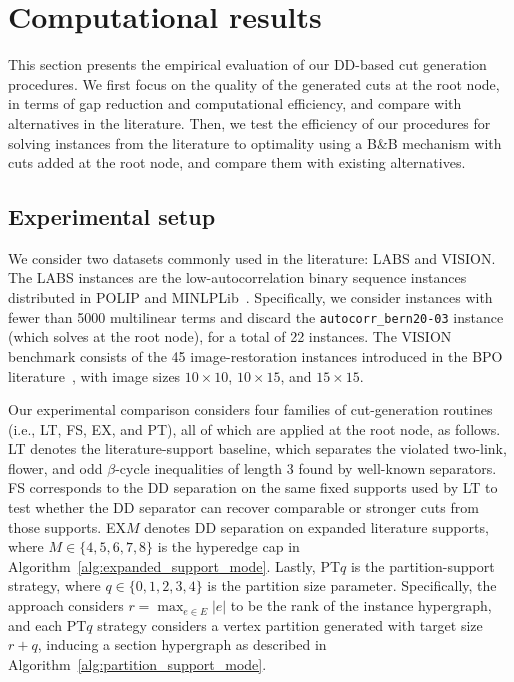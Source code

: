 \section{Computational results}
\label{sec:experimental_design}


This section presents the empirical evaluation of our DD-based cut generation procedures. We first focus on the quality of the generated cuts at the root node, in terms of gap reduction and computational efficiency, and compare with alternatives in the literature. Then, we test the efficiency of our procedures for solving instances from the literature to optimality using a B\&B mechanism with cuts added at the root node, and compare them with existing alternatives. %

 
\subsection{Experimental setup}


We consider two datasets commonly used in the literature: LABS and VISION.  The LABS instances are the low-autocorrelation binary sequence instances distributed in POLIP and MINLPLib~\cite{polip,minlplib,delPiaWalter2024simple}. Specifically, we consider instances with fewer than 5000 multilinear terms and discard the \texttt{autocorr\_bern20-03} instance (which solves at the root node), for a total of 22 instances. The VISION benchmark consists of the 45 image-restoration instances introduced in the BPO literature~\cite{delPiaKhajaviradSahinidis2020impact}, with image sizes $10\times 10$, $10\times 15$, and $15\times 15$.

Our experimental comparison considers four families of cut-generation routines (i.e., LT, FS, EX, and PT), all of which are applied at the root node, as follows. LT denotes the literature-support baseline, which separates the violated two-link, flower, and odd $\beta$-cycle inequalities of length 3 found by well-known separators. FS  corresponds to the DD separation on the same fixed supports used by LT to test whether the DD separator can recover comparable or stronger cuts from those supports. EX$M$ denotes DD separation on expanded literature supports, where $M\in \{4,5,6,7,8\}$ is the hyperedge cap in Algorithm~\ref{alg:expanded_support_mode}. Lastly, PT$q$ is the partition-support strategy, where $q\in \{0,1,2,3,4\}$ is the partition size parameter. Specifically, the approach considers $r=\max_{e\in E}|e|$ to be the rank of the instance hypergraph, and each PT$q$ strategy considers a vertex partition generated with target size $r+q$, inducing a section hypergraph as described in  Algorithm~\ref{alg:partition_support_mode}. %

